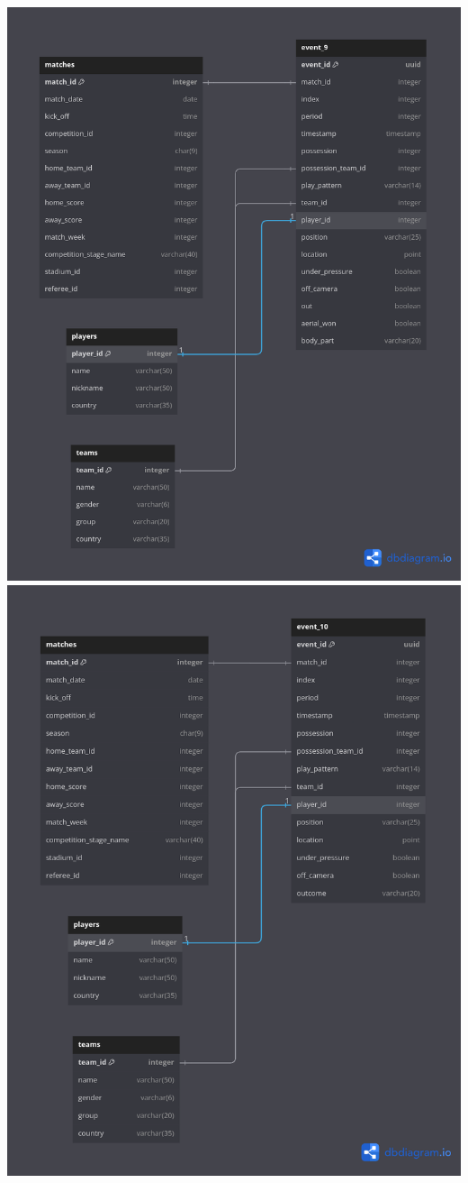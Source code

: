 \documentclass[12pt]{article}
\begin{document}
\includegraphics[width=\textwidth]{schema-diagram/event_9.png}
\includegraphics[width=\textwidth]{schema-diagram/event_10.png}
\end{document}
